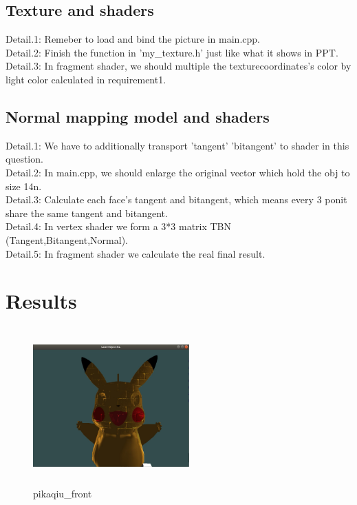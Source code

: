 \documentclass[acmtog]{acmart}
\begin{document}
\vspace*{1 ex}
\subsection{Texture and shaders}
Detail.1: Remeber to load and bind the picture in main.cpp.
\\Detail.2: Finish the function in 'my\_texture.h' just like what it shows in PPT.
\\Detail.3: In fragment shader, we should multiple the texturecoordinates's color by light color calculated in requirement1.

\vspace*{1 ex}
\subsection{Normal mapping model and shaders}
Detail.1: We have to additionally transport 'tangent' 'bitangent' to shader in this question.
\\Detail.2: In main.cpp, we should enlarge the original vector which hold the obj to size 14n.
\\Detail.3: Calculate each face's tangent and bitangent, which means every 3 ponit share the same  tangent and bitangent.
\\Detail.4: In vertex shader we form a 3*3 matrix TBN (Tangent,Bitangent,Normal).
\\Detail.5: In fragment shader we calculate the real final result.

\vspace*{2 ex}
\section{Results}

\begin{figure}[h]
\centering
\includegraphics[width=6cm,height=6cm]{1.png}
\caption{pikaqiu\_front}
\end{figure}
\end{document}
